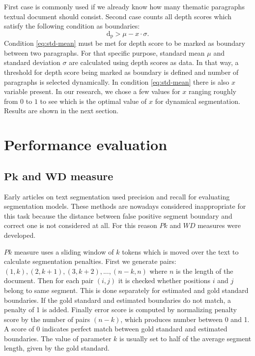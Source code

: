 \documentclass[10pt, a4paper]{article}
\begin{document}
First case is commonly used if we already know how many thematic paragraphs textual document should consist. Second case counts all depth scores which satisfy the following condition as boundaries:
\begin{equation}\label{eq:std-mean}
\mathrm{d_p} > \mu - x \cdot \sigma.
\end{equation}
Condition \eqref{eq:std-mean} must be met for depth score to be marked as boundary between two paragraphs. For that specific purpose, standard mean $\mu$ and standard deviation $\sigma$ are calculated using depth scores as data. In that way, a threshold for depth score being marked as boundary is defined and number of paragraphs is selected dynamically. In condition \eqref{eq:std-mean} there is also $x$ variable present. In our research, we chose a few values for $x$ ranging roughly from $0$ to $1$ to see which is the optimal value of $x$ for dynamical segmentation. Results are shown in the next section.


\section{Performance evaluation}
\subsection{$\mathbf{Pk}$ and $\mathbf{WD}$ measure}
Early articles on text segmentation \citep{hearst-ref} used precision and recall for evaluating segmentation models. These methods are nowadays considered inappropriate for this task because the distance between false positive segment boundary and correct one is not considered at all. For this reason $Pk$ \citep{pk-ref} and $WD$ \citep{wd-ref} measures were developed.

$Pk$ measure uses a sliding window of $k$ tokens which is moved over the text to calculate segmentation penalties. First we generate pairs: $(1, k), (2, k+1), (3, k+2), ..., (n-k, n)$ where $n$ is the length of the document. Then for each pair $(i,j)$ it is checked whether positions $i$ and $j$ belong to same segment. This is done separately for estimated and gold standard boundaries. If the gold standard and estimated boundaries do not match, a penalty of 1 is added. Finally error score is computed by normalizing penalty score by the number of pairs $(n-k)$, which produces number between 0 and 1. A score of 0 indicates perfect match between gold standard and estimated boundaries. The value of parameter $k$ is usually set to half of the average segment length, given by the gold standard.
\end{document}
